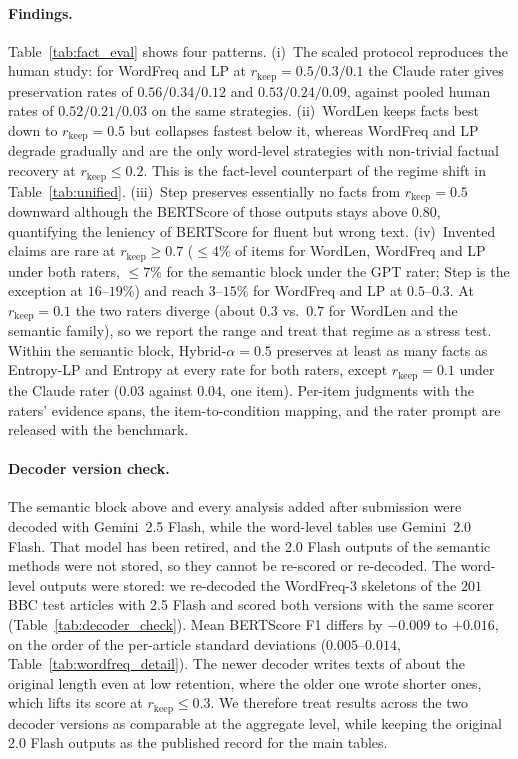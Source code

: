 \documentclass[11pt]{article}
\newcommand{\rkeep}{r_{\mathrm{keep}}}
\begin{document}
\paragraph{Findings.}
Table~\ref{tab:fact_eval} shows four patterns. (i)~The scaled protocol reproduces the human study:
for WordFreq and LP at $\rkeep=0.5/0.3/0.1$ the Claude rater gives preservation rates of
$0.56/0.34/0.12$ and $0.53/0.24/0.09$, against pooled human rates of $0.52/0.21/0.03$ on the same
strategies. (ii)~WordLen keeps facts best down to $\rkeep=0.5$ but collapses fastest below it, whereas
WordFreq and LP degrade gradually and are the only word-level strategies with non-trivial factual
recovery at $\rkeep\le0.2$. This is the fact-level counterpart of the regime shift in
Table~\ref{tab:unified}. (iii)~Step preserves essentially no facts from $\rkeep=0.5$ downward although
the BERTScore of those outputs stays above $0.80$, quantifying the leniency of BERTScore
for fluent but wrong text. (iv)~Invented claims are rare at $\rkeep\ge0.7$ ($\le4\%$ of items for WordLen, WordFreq and LP under both raters, $\le7\%$ for the semantic block under the GPT rater; Step is the exception at $16$--$19\%$) and reach $3$--$15\%$ for WordFreq and LP at $0.5$--$0.3$. At $\rkeep=0.1$ the two raters diverge (about $0.3$ vs.\ $0.7$ for WordLen and the semantic family), so we report the range and
treat that regime as a stress test. Within the semantic block, Hybrid-$\alpha{=}0.5$ preserves at least as many facts as Entropy-LP and Entropy at every rate for both raters, except $\rkeep=0.1$ under the Claude rater ($0.03$ against $0.04$, one item). Per-item judgments with the raters'
evidence spans, the item-to-condition mapping, and the rater prompt are released with the benchmark.

\paragraph{Decoder version check.}
The semantic block above and every analysis added after submission were decoded with Gemini~2.5 Flash,
while the word-level tables use Gemini~2.0 Flash. That model has been retired, and the 2.0 Flash outputs of
the semantic methods were not stored, so they cannot be re-scored or re-decoded. The word-level outputs
were stored: we re-decoded the WordFreq-3 skeletons of the $201$ BBC test articles with 2.5 Flash and scored
both versions with the same scorer (Table~\ref{tab:decoder_check}). Mean BERTScore F1 differs by $-0.009$ to
$+0.016$, on the order of the per-article standard deviations ($0.005$--$0.014$, Table~\ref{tab:wordfreq_detail}).
The newer decoder writes texts of about the original length even at low retention, where the older one wrote
shorter ones, which lifts its score at $\rkeep \le 0.3$. We therefore treat results across the two decoder
versions as comparable at the aggregate level, while keeping the original 2.0 Flash outputs as the
published record for the main tables.
\end{document}
